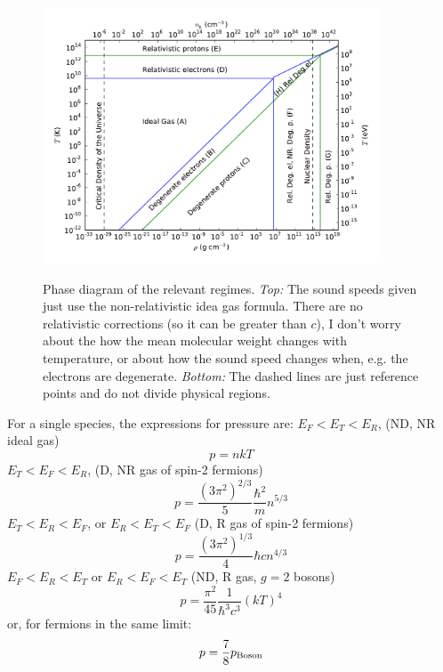 \documentclass{emulateapj}
\begin{document}
\begin{figure}
  \centering
  \includegraphics[width=0.9\textwidth]{f3}\\
  \caption{Phase diagram of the relevant regimes.  {\it Top:} The
    sound speeds given just use the non-relativistic idea gas formula.
    There are no relativistic corrections (so it can be greater than
    $c$), I don't worry about the how the mean molecular weight
    changes with temperature, or about how the sound speed changes
    when, e.g. the electrons are degenerate. {\it Bottom:} The dashed
    lines are just reference points and do not divide physical
    regions.}
  \label{fig:eos-regimes}
\end{figure}


For a single species, the expressions for pressure are:
$E_F < E_T < E_R$, (ND, NR ideal gas)
\begin{equation}
  p = n k T
\end{equation}
$E_T < E_F < E_R$, (D, NR gas of spin-2 fermions)
\begin{equation}
  p = \frac{(3 \pi^2)^{2/3}}{5} \frac{\hbar^2}{m} n^{5/3}
\end{equation}
$E_T < E_R < E_F$, or $E_R < E_T < E_F$ (D, R gas of spin-2 fermions)
\begin{equation}
  p = \frac{(3\pi^2)^{1/3}}{4} \hbar c n^{4/3}
\end{equation}
$E_F < E_R < E_T$ or $E_R < E_F < E_T$ (ND, R gas, $g=2$ bosons)
\begin{equation}
  p = \frac{\pi^2}{45} \frac{1}{\hbar^3 c^3} (kT)^4
\end{equation}
or, for fermions in the same limit:
\begin{equation}
  p = \frac{7}{8} p_{\rm Boson}
\end{equation}
\end{document}

